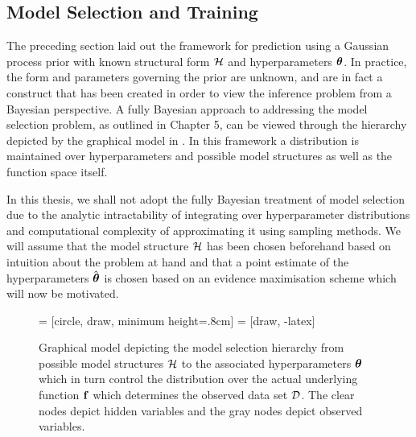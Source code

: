 \subsection{Model Selection and Training} \label{sec:nLML}
The preceding section laid out the framework for prediction using a Gaussian process prior with known structural form $\mathcal{H}$ and hyperparameters $\boldsymbol{\theta}$. In practice, the form and parameters governing the prior are unknown, and are in fact a construct that has been created in order to view the inference problem from a Bayesian perspective. A fully Bayesian approach to addressing the model selection problem, as outlined in \cite{RaWi06} Chapter 5, can be viewed through the hierarchy depicted by the graphical model in . In this framework a distribution is maintained over hyperparameters and possible model structures as well as the function space itself.

In this thesis, we shall not adopt the fully Bayesian treatment of model selection due to the analytic intractability of integrating over hyperparameter distributions and computational complexity of approximating it using sampling methods. We will assume that the model structure $\mathcal{H}$ has been chosen beforehand based on intuition about the problem at hand and that a point estimate of the hyperparameters $\hat{\boldsymbol{\theta}}$ is chosen based on an evidence maximisation scheme which will now be motivated.

\begin{figure}[t]
\centering
%
 = [circle, draw, minimum height=.8cm]
 = [draw, -latex]
%
\caption{Graphical model depicting the model selection hierarchy from possible model structures $\mathcal{H}$ to the associated hyperparameters $\boldsymbol{\theta}$ which in turn control the distribution over the actual underlying function $\mathbf{f}$ which determines the observed data set $\mathcal{D}$. The clear nodes depict hidden variables and the gray nodes depict observed variables.}
\label{fig:modsel}
\end{figure}

